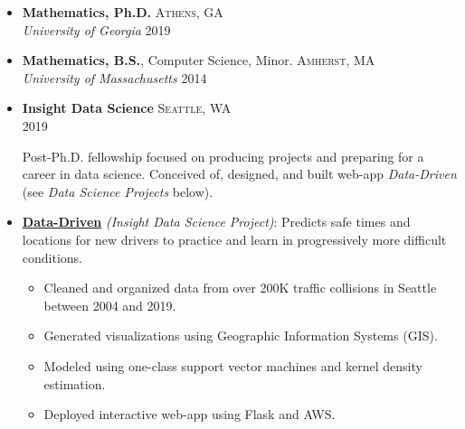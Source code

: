 \documentclass[10pt]{article}
\begin{document}
{ \spacedhrule{0.5em}{-0.5em}

 
 \begin{itemize}
   \item \textbf{Mathematics, Ph.D.} \hfill \textsc{Athens, GA} \\
         \emph{University of Georgia} \hfill \textsc{2019}
   \item {\textbf{Mathematics, B.S.}, Computer Science, Minor. } \hfill \textsc{Amherst, MA} \\
   \emph{University of Massachusetts} \hfill \textsc{2014}
 \end{itemize}
 

\spacedhrule{0.5em}{-0.4em}


\begin{itemize}
  \item \textbf{Insight Data Science} \hfill \textsc{Seattle, WA} \\
        \null \hfill \textsc{2019}

        \vspace{-1em}
  \parbox[H]{15cm}{ 
        Post-Ph.D. fellowship focused on producing projects and preparing for a career in data science. Conceived of, designed, and built web-app \emph{Data-Driven} (see \emph{Data Science Projects} below).
        }
\end{itemize}


\spacedhrule{0.5em}{-0.4em}

\begin{itemize}
  \item \textbf{\href{http://bit.ly/insight_dd}{Data-Driven}} \emph{(Insight Data Science Project)}: Predicts safe times and locations for new drivers to practice and learn in progressively more difficult conditions.
  
  \begin{itemize}
    \item Cleaned and organized data from over 200K traffic collisions in Seattle between 2004 and 2019.
    \item Generated visualizations using Geographic Information Systems (GIS).
    \item Modeled using one-class support vector machines and kernel density estimation.
    \item Deployed interactive web-app using Flask and AWS.
  \end{itemize} 
\end{itemize}

}
\end{document}
